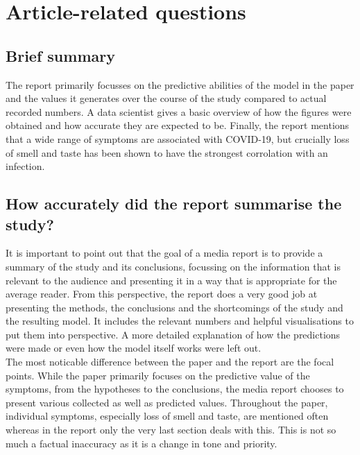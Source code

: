 \documentclass{article}
\begin{document}
\section{Article-related questions}

\subsection{Brief summary}

The report primarily focusses on the predictive abilities of the model in the paper and
the values it generates over the course of the study compared to actual recorded numbers.
A data scientist gives a basic overview of how the figures were obtained and how accurate
they are expected to be. Finally, the report mentions that a wide range of symptoms
are associated with COVID-19, but crucially loss of smell and taste has been shown to
have the strongest corrolation with an infection.

\subsection{How accurately did the report summarise the study?}

It is important to point out that the goal of a media report is to provide
a summary of the study and its conclusions, focussing on the information that
is relevant to the audience and presenting it in a way that is appropriate for the
average reader. From this perspective, the report does a very good job at presenting
the methods, the conclusions and the shortcomings of the study and the resulting model.
It includes the relevant numbers and helpful visualisations to put them into perspective.
A more detailed explanation of how the predictions were made or even how the model itself
works were left out.\\
\indent The most noticable difference between the paper and the report are the focal points.
While the paper primarily focuses on the predictive value of the symptoms,
from the hypotheses to the conclusions, the media report chooses to present
various collected as well as predicted values. Throughout the paper, individual symptoms, especially
loss of smell and taste, are mentioned often whereas in the report only the very last
section deals with this. This is not so much a factual inaccuracy as it is a
change in tone and priority.
\end{document}
